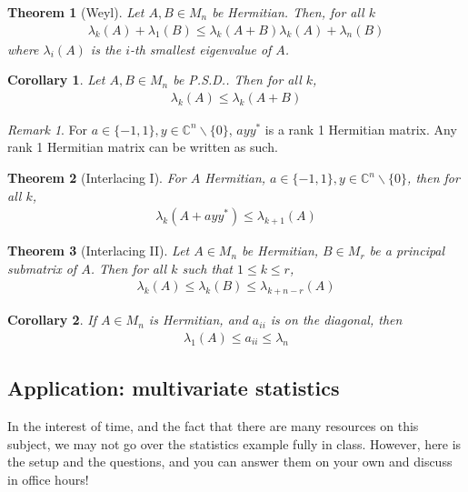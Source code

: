 \documentclass[11pt]{article}
\newcommand{\C}{\ensuremath{\mathbb C}}
\theoremstyle{plain}
\newtheorem{thm}{Theorem}[section]
\newtheorem{coro}{Corollary}[section]
\theoremstyle{definition}
\theoremstyle{remark}
\newtheorem{rem}{Remark}[section]
\begin{document}
\begin{thm}[Weyl]
    Let $A, B \in M_n$ be Hermitian. Then, for all $k$
    \begin{align*}
        \lambda_k(A) + \lambda_1(B) \leq \lambda_k(A + B) \lambda_k(A) + \lambda_n(B)
    \end{align*}
    where $\lambda_i(A)$ is the $i$-th smallest eigenvalue of $A$.
\end{thm}

\begin{coro}
    Let $A, B \in M_n$ be P.S.D.. Then for all $k$,
    \begin{align*}
        \lambda_k(A) \leq \lambda_k(A + B)
    \end{align*}
\end{coro}

\begin{rem}
    For $a \in \{-1, 1\}, y \in \C^n \backslash \{0\}$, $ayy^*$ is a rank 1 Hermitian matrix. Any rank 1 Hermitian matrix can be written as such.
\end{rem}
\begin{thm}[Interlacing I]
    For $A$ Hermitian, $a \in \{-1, 1\}, y \in \C^n \backslash \{0\}$, then for all $k$,
    \begin{align*}
        \lambda_k(A + ayy^*) \leq \lambda_{k+1}(A) 
    \end{align*}
\end{thm}

\begin{thm}[Interlacing II]
    Let $A \in M_n$ be Hermitian, $B \in M_r$ be a principal submatrix of $A$. Then for all $k$ such that $1 \leq k \leq r$,
    \begin{align*}
        \lambda_k(A) \leq \lambda_k(B) \leq \lambda_{k+n-r}(A)
    \end{align*}
\end{thm}

\begin{coro}
    If $A \in M_n$ is Hermitian, and $a_{ii}$ is on the diagonal, then
    \begin{align*}
        \lambda_1(A) \leq a_{ii} \leq \lambda_n
    \end{align*}
\end{coro}

\subsection*{Application: multivariate statistics}

In the interest of time, and the fact that there are many resources on this subject, we may not go over the statistics example fully in class. However, here is the setup and the questions, and you can answer them on your own and discuss in office hours!
\end{document}
